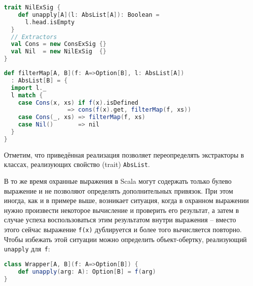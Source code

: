 \noindent
\begin{minipage}{\linewidth}
\begin{lstlisting}[language=scala]
  trait NilExSig {
    def unapply[A](l: AbsList[A]): Boolean = 
      l.head.isEmpty
  }
  // Extractors
  val Cons = new ConsExSig {}
  val Nil  = new NilExSig  {}
}
\end{lstlisting}
\end{minipage}


\noindent
\begin{minipage}{\linewidth}
\begin{lstlisting}[language=scala]
def filterMap[A, B](f: A=>Option[B], l: AbsList[A])
  : AbsList[B] = {
  import l._
  l match {
    case Cons(x, xs) if f(x).isDefined
                  => cons(f(x).get, filterMap(f, xs))
    case Cons(_, xs) => filterMap(f, xs)
    case Nil()       => nil
  }
}
\end{lstlisting}
\end{minipage}

Отметим, что приведённая реализация позволяет переопределять экстракторы в классах, реализующих свойство (trait) \lstinline|AbsList|.

В то же время охранные выражения в Scala могут содержать только булево выражение и не позволяют определять дополнительных привязок. При этом иногда, как и в примере выше, возникает ситуация, когда в охранном выражении нужно произвести некоторое вычисление и проверить его результат, а затем в случае успеха воспользоваться этим результатом внутри выражения -- вместо этого сейчас выражение \lstinline|f(x)| дублируется и более того вычисляется повторно. Чтобы избежать этой ситуации можно определить объект-обертку, реализующий \lstinline|unapply| \mbox{для \lstinline|f|:}

\noindent
\begin{minipage}{\linewidth}
\begin{lstlisting}[language=scala]
class Wrapper[A, B](f: A=>Option[B]) {
    def unapply(arg: A): Option[B] = f(arg)
}
\end{lstlisting}
\end{minipage}


